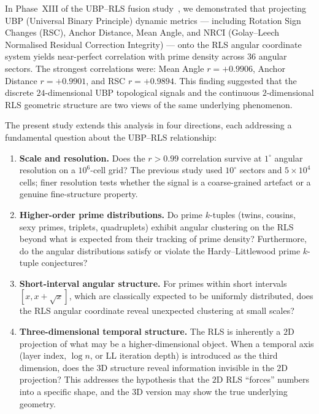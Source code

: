 \documentclass[11pt,a4paper]{article}
\theoremstyle{definition}
\begin{document}
In Phase~XIII of the UBP--RLS fusion study~\cite{phase13paper}, we demonstrated
that projecting UBP (Universal Binary Principle) dynamic metrics --- including
Rotation Sign Changes (RSC), Anchor Distance, Mean Angle, and NRCI (Golay--Leech
Normalised Residual Correction Integrity) --- onto the RLS angular coordinate
system yields near-perfect correlation with prime density across 36 angular
sectors.  The strongest correlations were: Mean Angle $r = +0.9906$, Anchor
Distance $r = +0.9901$, and RSC $r = +0.9894$.  This finding suggested that the
discrete $24$-dimensional UBP topological signals and the continuous
$2$-dimensional RLS geometric structure are two views of the same underlying
phenomenon.

The present study extends this analysis in four directions, each addressing a
fundamental question about the UBP--RLS relationship:

\begin{enumerate}[label=(\roman*)]
    \item \textbf{Scale and resolution.} Does the $r > 0.99$ correlation
          survive at $1^{\circ}$ angular resolution on a $10^6$-cell grid?
          The previous study used $10^{\circ}$ sectors and $5\times10^4$
          cells; finer resolution tests whether the signal is a coarse-grained
          artefact or a genuine fine-structure property.

    \item \textbf{Higher-order prime distributions.} Do prime $k$-tuples
          (twins, cousins, sexy primes, triplets, quadruplets) exhibit angular
          clustering on the RLS beyond what is expected from their tracking
          of prime density?  Furthermore, do the angular distributions satisfy
          or violate the Hardy--Littlewood prime $k$-tuple conjectures?

    \item \textbf{Short-interval angular structure.} For primes within short
          intervals $[x, x + \sqrt{x}]$, which are classically expected to be
          uniformly distributed, does the RLS angular coordinate reveal
          unexpected clustering at small scales?

    \item \textbf{Three-dimensional temporal structure.} The RLS is inherently
          a $2$D projection of what may be a higher-dimensional object.
          When a temporal axis (layer index, $\log n$, or LL iteration depth)
          is introduced as the third dimension, does the $3$D structure reveal
          information invisible in the $2$D projection?  This addresses the
          hypothesis that the $2$D RLS ``forces'' numbers into a specific shape,
          and the $3$D version may show the true underlying geometry.
\end{enumerate}
\end{document}
